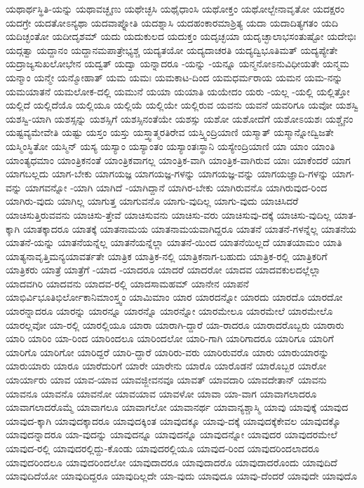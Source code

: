 {ಯಥಾರ್ಥಸ್ಥಿತಿ-ಯನ್ನು
ಯಥಾವಚ್ಛೃಣು
ಯಥೇಚ್ಛಸಿ
ಯಥೈಧಾಂಸಿ
ಯಥೋಕ್ತಂ
ಯಥೋಲ್ಬೇನಾವೃತೋ
ಯದಕ್ಷರಂ
ಯದಗ್ರೇ
ಯದತೋಽನ್ಯಥಾ
ಯದವಾಪ್ನೋತಿ
ಯದಶ್ನಾಸಿ
ಯದಹಂಕಾರಮಾಶ್ರಿತ್ಯ
ಯದಾ
ಯದಾದಿತ್ಯಗತಂ
ಯದಿ
ಯದಿಚ್ಛಂತೋ
ಯದೀದೃಶಮ್
ಯದು
ಯದುಕುಲದ
ಯದುಕ್ತಂ
ಯದೃಚ್ಛಯಾ
ಯದೃಚ್ಛಾಲಾಭಸಂತುಷ್ಟೋ
ಯದೇಭಿಃ
ಯದ್ಗತ್ವಾ
ಯದ್ದಾನಂ
ಯದ್ದಾನಮಪಾತ್ರೇಭ್ಯಶ್ಚ
ಯದ್ಯತಯೋ
ಯದ್ಯದಾಚರತಿ
ಯದ್ಯದ್ವಿಭೂತಿಮತ್
ಯದ್ಯಪ್ಯೇತೇ
ಯದ್ರಾಜ್ಯಸುಖಲೋಭೇನ
ಯದ್ವತ್
ಯದ್ವಾ
ಯನ್ನಾದರೂ
-ಯನ್ನು
-ಯನ್ನೂ
ಯನ್ಮನೋಽನುವಿಧೀಯತೇ
ಯನ್ಮಮ
ಯನ್ಮಾಂ
ಯನ್ಮೇ
ಯನ್ಮೋಹಾತ್
ಯಮ
ಯಮಃ
ಯಮಕಾಟ-ದಿಂದ
ಯಮಧರ್ಮರಾಯ
ಯಮನ
ಯಮ-ನನ್ನು
ಯಮಯಾತನೆ
ಯಮಲೋಕ-ದಲ್ಲಿ
ಯಮುನೆ
ಯಯಾ
ಯಯಾತಿ
ಯಯೇದಂ
ಯರು
-ಯಲ್ಲ
-ಯಲ್ಲಿ
ಯಲ್ಲಿತ್ತೋ
ಯಲ್ಲಿದೆ
ಯಲ್ಲಿದೆಯೊ
ಯಲ್ಲಿಯೂ
ಯಲ್ಲಿಯೆ
ಯಲ್ಲಿಯೇ
ಯಲ್ಲಿರುವ
ಯವನು
ಯವನೆ
ಯವರಿಗೂ
ಯವೋ
ಯಶಸ್ವಿ
ಯಶಸ್ವಿ-ಯಾಗಿ
ಯಶಸ್ಸನ್ನು
ಯಶಸ್ಸಿಗೆ
ಯಶಸ್ಸಿನಂತೆಯೇ
ಯಶಸ್ಸು
ಯಶೋ
ಯಶೋದೆಗೆ
ಯಶೋಽಯಶಃ
ಯಶ್ಚೈನಂ
ಯಷ್ಟವ್ಯಮೇವೇತಿ
ಯಷ್ಟು
ಯಸ್ತಂ
ಯಸ್ತು
ಯಸ್ತ್ವಾತ್ಮರತಿರೇವ
ಯಸ್ತ್ವಿಂದ್ರಿಯಾಣಿ
ಯಸ್ಮಾತ್
ಯಸ್ಮಾನ್ನೋದ್ವಿಜತೇ
ಯಸ್ಮಿಂಸ್ಥಿತೋ
ಯಸ್ಮಿನ್
ಯಸ್ಯ
ಯಸ್ಯಾಂ
ಯಸ್ಯಾಂತಂ
ಯಸ್ಯಾಂತಃಸ್ಥಾನಿ
ಯಸ್ಯೇಂದ್ರಿಯಾಣಿ
ಯಾ
ಯಾಂ
ಯಾಂತಿ
ಯಾಂತ್ಯಧಮಾಂ
ಯಾಂತ್ರಿಕನಂತೆ
ಯಾಂತ್ರಿಕವಾಗಲ್ಲ
ಯಾಂತ್ರಿಕ-ವಾಗಿ
ಯಾಂತ್ರಿಕ-ವಾಗಿರುವ
ಯಾಃ
ಯಾಕೆಂದರೆ
ಯಾಗ
ಯಾಗಬಲ್ಲದು
ಯಾಗ-ಬೇಕು
ಯಾಗಯಜ್ಞ
ಯಾಗಯಜ್ಞ-ಗಳನ್ನು
ಯಾಗಯಜ್ಞ-ವನ್ನು
ಯಾಗಯಜ್ಞಾದಿ-ಗಳನ್ನು
ಯಾಗ-ವನ್ನು
ಯಾಗವನ್ನೋ
-ಯಾಗಿ
ಯಾಗಿದೆ
-ಯಾಗಿದ್ದಾನೆ
ಯಾಗಿರ-ಬೇಕು
ಯಾಗಿರುವನೊ
ಯಾಗಿರುವುದ-ರಿಂದ
ಯಾಗಿರು-ವುದು
ಯಾಗಿಲ್ಲ
ಯಾಗುತ್ತ
ಯಾಗುವನೊ
ಯಾಗು-ವುದಿಲ್ಲ
ಯಾಗು-ವುದು
ಯಾಚಿಸಿದರೆ
ಯಾಚಿಸುತ್ತಿರುವವನು
ಯಾಚಿಸು-ತ್ತೇವೆ
ಯಾಚಿಸುವನು
ಯಾಚಿಸು-ವರು
ಯಾಚಿಸುವು-ದಕ್ಕೆ
ಯಾಚಿಸು-ವುದಿಲ್ಲ
ಯಾತ-ಕ್ಕಾಗಿ
ಯಾತಕ್ಕಾದರೂ
ಯಾತಕ್ಕೆ
ಯಾತನಾಮಯ
ಯಾತನಾಮಯವಾಗಿದ್ದರೂ
ಯಾತನೆ
ಯಾತನೆ-ಗಳನ್ನೆಲ್ಲ
ಯಾತನೆಯ
ಯಾತನೆ-ಯನ್ನು
ಯಾತನೆಯನ್ನೆಲ್ಲ
ಯಾತನೆಯನ್ನೆಲ್ಲಾ
ಯಾತನೆ-ಯಿಂದ
ಯಾತನೆಯಿಲ್ಲದೆ
ಯಾತಯಾಮಂ
ಯಾತಿ
ಯಾತ್ಯನಾವೃತ್ತಿಮನ್ಯಯಾವರ್ತತೇ
ಯಾತ್ರಿಕ
ಯಾತ್ರಿಕ-ನಲ್ಲಿ
ಯಾತ್ರಿಕನಾಗ-ಬಹುದು
ಯಾತ್ರಿಕ-ರಲ್ಲಿ
ಯಾತ್ರಿಕರಿಗೆ
ಯಾತ್ರಿಕರು
ಯಾತ್ರೆ
ಯಾತ್ರೆಗೆ
-ಯಾದ
-ಯಾದರೂ
ಯಾದರೆ
ಯಾದರೋ
ಯಾದವ
ಯಾದವಕುಲದಲ್ಲೆಲ್ಲಾ
ಯಾದವಗಿರಿ
ಯಾದವನು
ಯಾದವ-ರಲ್ಲಿ
ಯಾದಸಾಮಹಮ್
ಯಾನೇನ
ಯಾಪನೆ
ಯಾಭಿರ್ವಿಭೂತಿಭಿರ್ಲೋಕಾನಿಮಾಂಸ್ತ್ವಂ
ಯಾಮಿಮಾಂ
ಯಾರ
ಯಾರದನ್ನೋ
ಯಾರದು
ಯಾರದೊ
ಯಾರದೋ
ಯಾರನ್ನಾದರೂ
ಯಾರನ್ನು
ಯಾರನ್ನೂ
ಯಾರನ್ನೊ
ಯಾರನ್ನೋ
ಯಾರಮೇಲೂ
ಯಾರಮೇಲೆ
ಯಾರಮೇಲೊ
ಯಾರಲ್ಲವೋ
ಯಾ-ರಲ್ಲಿ
ಯಾರಲ್ಲಿಯೂ
ಯಾರಾ
ಯಾರಾಗಿ-ದ್ದಾರೆ
ಯಾ-ರಾದರೂ
ಯಾರಾದರೊಬ್ಬರು
ಯಾರಾರು
ಯಾರಿ
ಯಾರಿಂ
ಯಾ-ರಿಂದ
ಯಾರಿಂದಲೂ
ಯಾರಿಂದಲೋ
ಯಾರಿ-ಗಾಗಿ
ಯಾರಿಗಾದರೂ
ಯಾರಿಗೂ
ಯಾರಿಗೆ
ಯಾರಿಗೊ
ಯಾರಿಗೋ
ಯಾರಿದ್ದರೆ
ಯಾರಿ-ದ್ದಾರೆ
ಯಾರಿರು-ವರು
ಯಾರಿರುವರೊ
ಯಾರು
ಯಾರುಯಾರನ್ನು
ಯಾರುಯಾರು
ಯಾರೂ
ಯಾರೆದುರಿಗೆ
ಯಾರೇ
ಯಾರೇನು
ಯಾರೊ
ಯಾರೊಡನೆ
ಯಾರೊಬ್ಬರ
ಯಾರೋ
ಯಾರ್ಯಾರು
ಯಾವ
ಯಾವ-ಯಾವ
ಯಾವಜ್ಜೀವನವೂ
ಯಾವತ್
ಯಾವದಾರಿ
ಯಾವದೇತಾನ್
ಯಾವನು
ಯಾವನೂ
ಯಾವನೊ
ಯಾವನೋ
ಯಾವಯಾವ
ಯಾವಳೋ
ಯಾವಾ
ಯಾ-ವಾಗ
ಯಾವಾಗಲಾದರೂ
ಯಾವಾಗಲಾದರೊಮ್ಮೆ
ಯಾವಾಗಲೂ
ಯಾವಾಗಲೋ
ಯಾವಾನರ್ಥ
ಯಾವಾನ್ಯಶ್ಚಾಸ್ಮಿ
ಯಾವು
ಯಾವುಕ್ಕೆ
ಯಾವುದ
ಯಾವುದ-ಕ್ಕಾಗಿ
ಯಾವುದಕ್ಕಾದರೂ
ಯಾವುದಕ್ಕಿಂತ
ಯಾವುದಕ್ಕೂ
ಯಾವು-ದಕ್ಕೆ
ಯಾವುದಕ್ಕೆಕೇವಲ
ಯಾವುದಕ್ಕೊ
ಯಾವುದನ್ನಾದರೂ
ಯಾ-ವುದನ್ನು
ಯಾವುದನ್ನೂ
ಯಾವುದನ್ನೊ
ಯಾವುದನ್ನೋ
ಯಾವುದರ
ಯಾವುದರಮೇಲೆ
ಯಾವುದ-ರಲ್ಲಿ
ಯಾವುದರಲ್ಲಿದ್ದು-ಕೊಂಡು
ಯಾವುದರಲ್ಲಿಯೂ
ಯಾವುದ-ರಿಂದ
ಯಾವುದರಿಂದಲಾದರೂ
ಯಾವುದರಿಂದಲೂ
ಯಾವುದರಿಂದಲೋ
ಯಾವುದಾದರೂ
ಯಾವುದಾದರೊ
ಯಾವುದಾದರೊಂದು
ಯಾವುದಿದೆ
ಯಾವುದಿದೆಯೋ
ಯಾವುದಿದ್ದರೂ
ಯಾವುದಿಲ್ಲದೇ
ಯಾ-ವುದು
ಯಾವುದೂ
ಯಾವು-ದೆಂದರೆ
ಯಾವುದೇ
ಯಾವುದೊ
}
